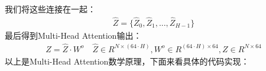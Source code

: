 \documentclass{article}
\begin{document}
我们将这些连接在一起：
\begin{equation}
\begin{aligned}
\hat{Z} = \{ \hat{Z}_{0}, \hat{Z}_{1}, ..., \hat{Z}_{H-1} \}
\end{aligned}
\label{e000116}
\end{equation}
最后得到Multi-Head Attention输出：
\begin{equation}
\begin{aligned}
Z = \hat{Z} \cdot W^{o} \quad \hat{Z} \in R^{N \times (64 \cdot H)}, W^{o} \in R^{(64 \cdot H) \times 64}, Z \in R^{N \times 64}
\end{aligned}
\label{e000116}
\end{equation}
以上是Multi-Head Attention数学原理，下面来看具体的代码实现：
\end{document}
